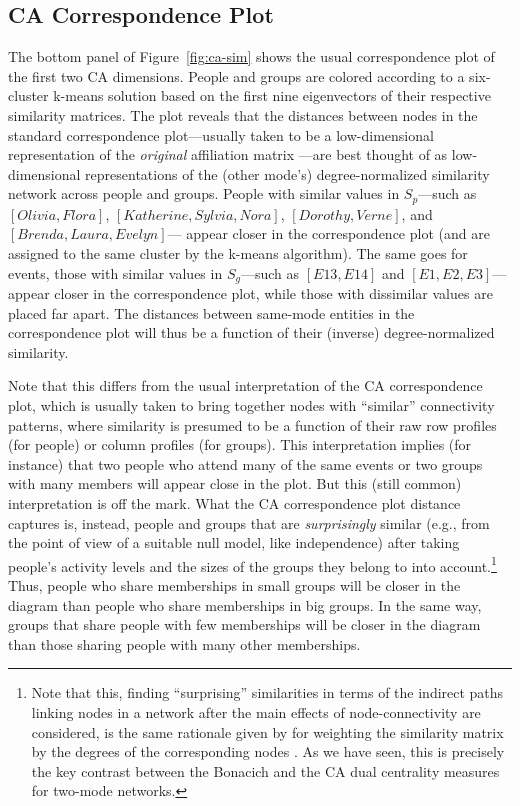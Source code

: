 \documentclass[a4paper,fleqn]{cas-sc}
\begin{document}
\subsection{CA Correspondence Plot} \label{subsec:caplot}
The bottom panel of Figure~\ref{fig:ca-sim} shows the usual correspondence plot of the first two CA dimensions. People and groups are colored according to a six-cluster k-means solution based on the first nine eigenvectors of their respective similarity matrices. The plot reveals that the distances between nodes in the standard correspondence plot---usually taken to be a low-dimensional representation of the \textit{original} affiliation matrix \citep{borgatti1997network}---are best thought of as low-dimensional representations of the (other mode's) degree-normalized similarity network across people and groups. People with similar values in $S_p$---such as $\left[Olivia, Flora\right]$,  $\left[Katherine, Sylvia, Nora\right]$, $\left[Dorothy, Verne\right]$, and $\left[Brenda, Laura, Evelyn\right]$--- appear closer in the correspondence plot (and are assigned to the same cluster by the k-means algorithm). The same goes for events, those with similar values in $S_g$---such as $\left[E13, E14\right]$ and $\left[E1, E2, E3\right]$---appear closer in the correspondence plot, while those with dissimilar values are placed far apart. The distances between same-mode entities in the correspondence plot will thus be a function of their (inverse) degree-normalized similarity.

Note that this differs from the usual interpretation of the CA correspondence plot, which is usually taken to bring together nodes with ``similar'' connectivity patterns, where similarity is presumed to be a function of their raw row profiles (for people) or column profiles (for groups). This interpretation implies (for instance) that two people who attend many of the same events or two groups with many members will appear close in the plot. But this (still common) interpretation is off the mark. What the CA correspondence plot distance captures is, instead, people and groups that are \textit{surprisingly} similar (e.g., from the point of view of a suitable null model, like independence) after taking people's activity levels and the sizes of the groups they belong to into account.\footnote{Note that this, finding ``surprising'' similarities in terms of the indirect paths linking nodes in a network after the main effects of node-connectivity are considered, is the same rationale given by \cite{leicht2006vertex} for weighting the \citet{katz1953new} similarity matrix by the degrees of the corresponding nodes \citep[see][68, eqs. 2.13 and 2.14]{fouss2016algorithms}. As we have seen, this is precisely the key contrast between the Bonacich and the CA dual centrality measures for two-mode networks.} Thus, people who share memberships in small groups will be closer in the diagram than people who share memberships in big groups. In the same way, groups that share people with few memberships will be closer in the diagram than those sharing people with many other memberships. 
\end{document}

